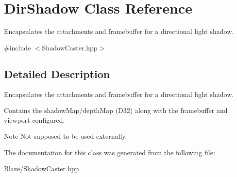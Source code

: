 \hypertarget{classDirShadow}{}\section{Dir\+Shadow Class Reference}
\label{classDirShadow}


Encapsulates the attachments and framebuffer for a directional light shadow.  




{\ttfamily \#include $<$Shadow\+Caster.\+hpp$>$}



\subsection{Detailed Description}
Encapsulates the attachments and framebuffer for a directional light shadow. 

Contains the shadow\+Map/depth\+Map (D32) along with the framebuffer and viewport configured.

\begin{DoxyNote}{Note}
Not supposed to be used externally. 
\end{DoxyNote}


The documentation for this class was generated from the following file\+:\begin{DoxyCompactItemize}
\item 
Blaze/Shadow\+Caster.\+hpp\end{DoxyCompactItemize}

